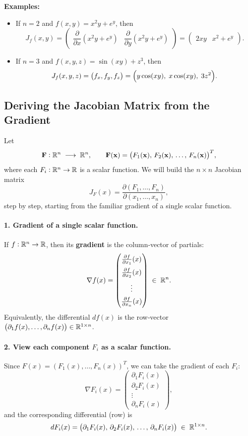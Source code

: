 \documentclass[11pt,openany]{article}
\renewcommand{\vec}[1]{\mathbf{#1}}
\renewcommand{\emph}[1]{\textbf{#1}}
\begin{document}
\bigskip

\noindent\textbf{Examples:}
\begin{itemize}
	\item If \(n=2\) and \(f(x,y)=x^2y+e^y\), then
	\[
	J_f(x,y)
	=\begin{pmatrix}
		\dfrac{\partial}{\partial x}(x^2y+e^y)
		&\dfrac{\partial}{\partial y}(x^2y+e^y)
	\end{pmatrix}
	=\begin{pmatrix}
		2xy & x^2 + e^y
	\end{pmatrix}.
	\]
	\item If \(n=3\) and \(f(x,y,z)=\sin(xy)+z^3\), then
	\[
	J_f(x,y,z)
	=\bigl(f_x,f_y,f_z\bigr)
	=\Bigl(y\cos(xy),\;x\cos(xy),\;3z^2\Bigr).
	\]
\end{itemize}
\subsection*{Deriving the Jacobian Matrix from the Gradient}

Let 
\[
\vec{F}:\R^n\;\longrightarrow\;\R^n,
\qquad
\vec{F}(\vec{x})
=\bigl(F_1(\vec{x}),\,F_2(\vec{x}),\,\dots,\,F_n(\vec{x})\bigr)^T,
\]
where each \(F_i:\mathbb{R}^n\to\mathbb{R}\) is a scalar function.  We will build the \(n\times n\) Jacobian matrix
\[
J_F(x)
=\frac{\partial(F_1,\dots,F_n)}{\partial(x_1,\dots,x_n)},
\]
step by step, starting from the familiar gradient of a single scalar function.

\bigskip

\paragraph{1. Gradient of a single scalar function.}  
If \(f:\mathbb{R}^n\to\mathbb{R}\), then its \emph{gradient} is the column‐vector of partials:
\[
\nabla f(x)
=\begin{pmatrix}
	\frac{\partial f}{\partial x_1}(x)\\[6pt]
	\frac{\partial f}{\partial x_2}(x)\\[6pt]
	\vdots\\[4pt]
	\frac{\partial f}{\partial x_n}(x)
\end{pmatrix}
\;\in\;\mathbb{R}^n.
\]
Equivalently, the differential \(df(x)\) is the row‐vector
\(\bigl(\partial_1 f(x),\dots,\partial_n f(x)\bigr)\in\mathbb{R}^{1\times n}\).

\bigskip

\paragraph{2. View each component \(F_i\) as a scalar function.}  
Since \(F(x)=(F_1(x),\dots,F_n(x))^T\), we can take the gradient of each \(F_i\):
\[
\nabla F_i(x)
=\begin{pmatrix}
	\partial_1 F_i(x)\\
	\partial_2 F_i(x)\\
	\vdots\\
	\partial_n F_i(x)
\end{pmatrix},
\]
and the corresponding differential (row) is
\[
dF_i(x) = 
\bigl(\partial_1F_i(x),\,\partial_2F_i(x),\,\dots,\,\partial_nF_i(x)\bigr)
\;\in\;\mathbb{R}^{1\times n}.
\]
\end{document}
